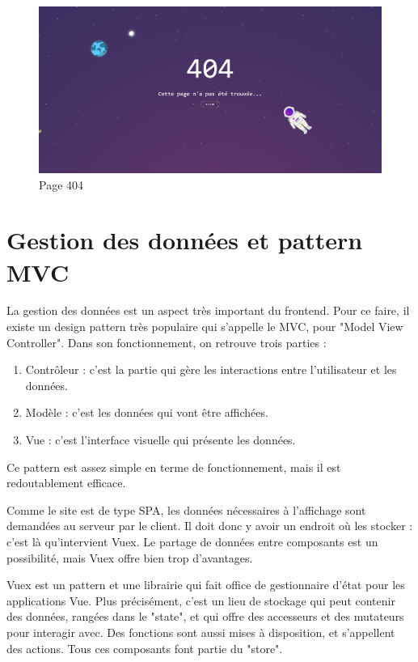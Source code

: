 \documentclass[
    iai, %
    eai, %
]{heig-tb}
\begin{document}
\begin{figure}[h]
  \includegraphics[width=14cm]{ui_404.PNG}
  \caption{Page 404}
\end{figure}


\newpage
\section{Gestion des données et pattern MVC}
La gestion des données est un aspect très important du frontend.
Pour ce faire, il existe un design pattern très populaire qui s'appelle le MVC, pour "Model View Controller".
Dans son fonctionnement, on retrouve trois parties :
\begin{enumerate}
  \item Contrôleur : c'est la partie qui gère les interactions entre l'utilisateur et les données.
  \item Modèle : c'est les données qui vont être affichées.
  \item Vue : c'est l'interface visuelle qui présente les données.
\end{enumerate}
\bigskip

Ce pattern est assez simple en terme de fonctionnement, mais il est redoutablement efficace.


Comme le site est de type SPA, les données nécessaires à l'affichage sont demandées au serveur par le client.
Il doit donc y avoir un endroit où les stocker : c'est là qu'intervient Vuex.
Le partage de données entre composants est un possibilité, mais Vuex offre bien trop d'avantages.

Vuex est un pattern et une librairie qui fait office de gestionnaire d'état pour les applications Vue.
Plus précisément, c'est un lieu de stockage qui peut contenir des données, rangées dans le "state", et qui offre des accesseurs et des mutateurs pour interagir avec.
Des fonctions sont aussi mises à disposition, et s'appellent des actions. Tous ces composants font partie du "store".
\end{document}
